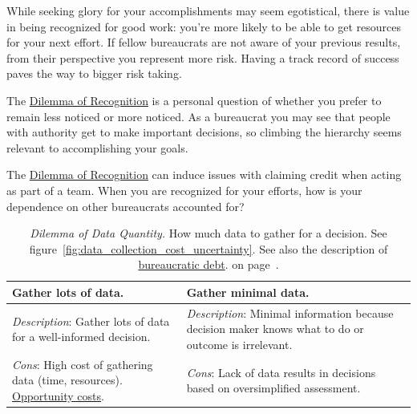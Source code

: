 While seeking glory for your accomplishments may seem egotistical, there is value in being recognized for good work: you're more likely to be able to get resources for your next effort. If fellow bureaucrats are not aware of your previous results, from their perspective you represent more risk. Having a track record of success paves the way to bigger risk taking.

The \hyperref[table:dilemma-personal-recognition-obscurity]{Dilemma of Recognition} is a personal question of whether you prefer to remain less noticed or more noticed. As a bureaucrat you may see that people with authority get to make important decisions, so climbing the hierarchy seems relevant to accomplishing your goals. 

The \hyperref[table:dilemma-personal-recognition-obscurity]{Dilemma of Recognition} can induce issues with claiming credit when acting as part of a team. When you are recognized for your efforts, how is your dependence on other bureaucrats accounted for?



\begin{center}
\begin{table}[H] %
\begin{tabular}{ | m{\dilemmatablewidth}| m{\dilemmatablewidth} | } 
  \hline
  \textbf{Gather lots of data.} &
  \textbf{Gather minimal data.} \\
  \hline
  \textit{Description}: Gather lots of data for a well-informed decision. &
  \textit{Description}: Minimal information because decision maker knows what to do or outcome is irrelevant.  \\  
  \hline
  \textit{Cons}: High cost of gathering data (time, resources). \href{https://en.wikipedia.org/wiki/Opportunity_cost}{Opportunity costs}.
  \index{Wikipedia!\href{https://en.wikipedia.org/wiki/Opportunity_cost}{Opportunity cost}}
  & 
  \textit{Cons}: Lack of data results in decisions based on oversimplified assessment. \\
  \hline
\end{tabular}
\caption{
\textit{Dilemma of Data Quantity.}
How much data to gather for a decision. See figure~\ref{fig:data_collection_cost_uncertainty}. See also the description of 
 \hyperref[sec:bureaucratic-debt]{bureaucratic debt}.
on page~\pageref{sec:bureaucratic-debt}.
}
\label{table:dilemma-personal-gather-data-lots-vs-little}
\end{table}
\end{center}

